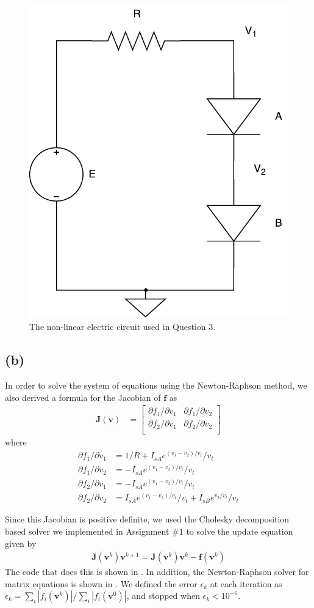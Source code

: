 \documentclass[journal,hidelinks]{IEEEtran}
\begin{document}
\begin{figure}[!htb]
  \centering
  \includegraphics[width=0.5\columnwidth]{question-3/q3-circuit.pdf}
  \caption{The non-linear electric circuit used in Question 3.}
  \label{fig:q3-circuit}
\end{figure}

\subsection*{(b)}

In order to solve the system of equations using the Newton-Raphson method, we also derived a formula for the Jacobian of $\boldsymbol{f}$ as
\begin{align}
\boldsymbol{J}(\boldsymbol{v}) &=
\begin{bmatrix}
\partial f_1 / \partial v_1 & \partial f_1 / \partial v_2 \\
\partial f_2 / \partial v_1 & \partial f_2 / \partial v_2 \\
\end{bmatrix}
\end{align}
where
\begin{align}
\partial f_1 / \partial v_1 &= 1 / R + I_{sA} e^{(v_1 - v_2)/v_t} / v_t \\
\partial f_1 / \partial v_2 &= -I_{sA} e^{(v_1 - v_2)/v_t} / v_t \\
\partial f_2 / \partial v_1 &= -I_{sA} e^{(v_1 - v_2)/v_t} / v_t \\
\partial f_2 / \partial v_2 &= I_{sA} e^{(v_1 - v_2)/v_t} / v_t + I_{sB} e^{v_2/v_t} / v_t
\end{align}

Since this Jacobian is positive definite, we used the Cholesky decomposition based solver we implemented in Assignment \#1 to solve the update equation given by
\begin{align}
\boldsymbol{J}(\boldsymbol{v}^{k}) \boldsymbol{v}^{k+1} = \boldsymbol{J}(\boldsymbol{v}^{k}) \boldsymbol{v}^{k} - \boldsymbol{f}(\boldsymbol{v}^{k})
\end{align}
The code that does this is shown in . In addition, the Newton-Raphson solver for matrix equations is shown in . We defined the error $\epsilon_k$ at each iteration as $\epsilon_k = \sum_{i} |f_i(\boldsymbol{v}^{k})| / \sum_{i} |f_i(\boldsymbol{v}^{0})|$, and stopped when $\epsilon_k < 10^{-6}$.
\end{document}
